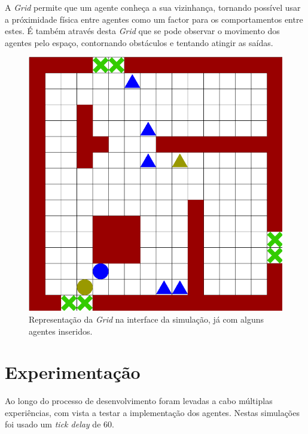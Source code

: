 \documentclass[12pt]{article}
\begin{document}
\begin{titlepage}
\begin{itemize}
\begin{itemize}
A \textit{Grid} permite que um agente conheça a sua vizinhança, tornando possível usar a próximidade física entre agentes como um factor para os comportamentos entre estes. É também através desta \textit{Grid} que se pode observar o movimento dos agentes pelo espaço, contornando obstáculos e tentando atingir as saídas.

\begin{figure}[H]
	\centering
	\includegraphics[scale=0.20]{map_simulation.png}
	\caption{Representação da \textit{Grid} na interface da simulação, já com alguns agentes inseridos.}
	\label{map}
\end{figure}

\end{itemize}
\end{itemize}

\newpage
\section{Experimentação}

Ao longo do processo de desenvolvimento foram levadas a cabo múltiplas experiências, com vista a testar a implementação dos agentes. Nestas simulações foi usado um \textit{tick delay} de 60. \newline
\begin{itemize}
	

\end{itemize}
\end{titlepage}
\end{document}
